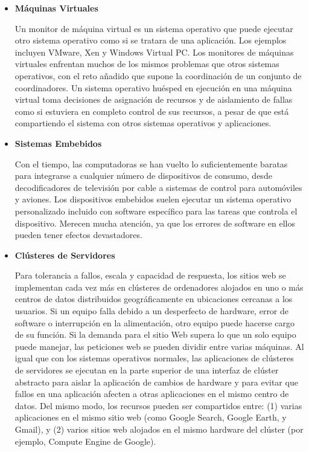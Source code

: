 \documentclass[10pt]{book}
\begin{document}
\begin{itemize}
\item \textbf{Máquinas Virtuales}

Un monitor de máquina virtual es un sistema operativo que puede ejecutar otro sistema operativo como si se tratara de una aplicación. Los ejemplos incluyen VMware, Xen y Windows Virtual PC. Los monitores de máquinas virtuales enfrentan muchos de los mismos problemas que otros sistemas operativos, con el reto añadido que supone la coordinación de un conjunto de coordinadores. Un sistema operativo huésped en ejecución en una máquina virtual toma decisiones de asignación de recursos y de aislamiento de fallas como si estuviera en completo control de sus recursos, a pesar de que está compartiendo el sistema con otros sistemas operativos y aplicaciones.

\item \textbf{Sistemas Embebidos}

Con el tiempo, las computadoras se han vuelto lo suficientemente baratas para integrarse a cualquier número de dispositivos de consumo, desde decodificadores de televisión por cable a sistemas de control para automóviles y aviones. Los dispositivos embebidos suelen ejecutar un sistema operativo personalizado incluido con software específico para las tareas que controla el dispositivo. Merecen mucha atención, ya que los errores de software en ellos pueden tener efectos devastadores.

\item \textbf{Clústeres de Servidores}

Para tolerancia a fallos, escala y capacidad de respuesta, los sitios web se implementan cada vez más en clústeres de ordenadores alojados en uno o más centros de datos distribuidos geográficamente en ubicaciones cercanas a los usuarios. Si un equipo falla debido a un desperfecto de hardware, error de software o interrupción en la alimentación, otro equipo puede hacerse cargo de su función. Si la demanda para el sitio Web supera lo que un solo equipo puede manejar, las peticiones web se pueden dividir entre varias máquinas. Al igual que con los sistemas operativos normales, las aplicaciones de clústeres de servidores se ejecutan en la parte superior de una interfaz de clúster abstracto para aislar la aplicación de cambios de hardware y para evitar que fallos en una aplicación afecten a otras aplicaciones en el mismo centro de datos. Del mismo modo, los recursos pueden ser compartidos entre: (1) varias aplicaciones en el mismo sitio web (como Google Search, Google Earth, y Gmail), y (2) varios sitios web alojados en el mismo hardware del clúster (por ejemplo, Compute Engine de Google).
\end{itemize}
\end{document}
